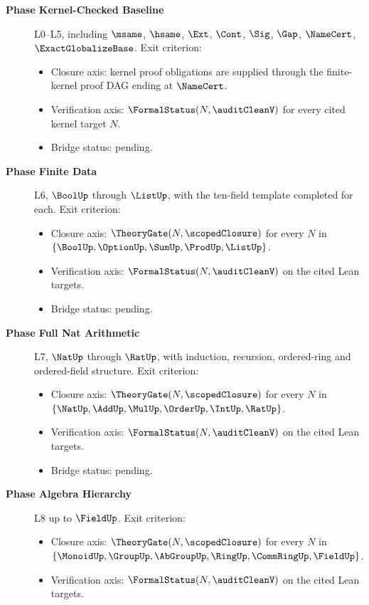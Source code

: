 \begin{description}
  \item[\textbf{Phase Kernel-Checked Baseline}] L0--L5, including $\msame$, $\hsame$, $\Ext$, $\Cont$, $\Sig$, $\Gap$, $\NameCert$, $\ExactGlobalizeBase$. Exit criterion:
    \begin{itemize}
      \item Closure axis: kernel proof obligations are supplied through the finite-kernel proof DAG ending at $\NameCert$.
      \item Verification axis: $\FormalStatus(N, \auditCleanV)$ for every cited kernel target $N$.
      \item Bridge status: pending.
    \end{itemize}
  \item[\textbf{Phase Finite Data}] L6, $\BoolUp$ through $\ListUp$, with the ten-field template completed for each. Exit criterion:
    \begin{itemize}
      \item Closure axis: $\TheoryGate(N, \scopedClosure)$ for every $N$ in $\{\BoolUp, \OptionUp, \SumUp, \ProdUp, \ListUp\}$.
      \item Verification axis: $\FormalStatus(N, \auditCleanV)$ on the cited Lean targets.
      \item Bridge status: pending.
    \end{itemize}
  \item[\textbf{Phase Full Nat Arithmetic}] L7, $\NatUp$ through $\RatUp$, with induction, recursion, ordered-ring and ordered-field structure. Exit criterion:
    \begin{itemize}
      \item Closure axis: $\TheoryGate(N, \scopedClosure)$ for every $N$ in $\{\NatUp, \AddUp, \MulUp, \OrderUp, \IntUp, \RatUp\}$.
      \item Verification axis: $\FormalStatus(N, \auditCleanV)$ on the cited Lean targets.
      \item Bridge status: pending.
    \end{itemize}
  \item[\textbf{Phase Algebra Hierarchy}] L8 up to $\FieldUp$. Exit criterion:
    \begin{itemize}
      \item Closure axis: $\TheoryGate(N, \scopedClosure)$ for every $N$ in $\{\MonoidUp, \GroupUp, \AbGroupUp, \RingUp, \CommRingUp, \FieldUp\}$.
      \item Verification axis: $\FormalStatus(N, \auditCleanV)$ on the cited Lean targets.

\end{itemize}
\end{description}
